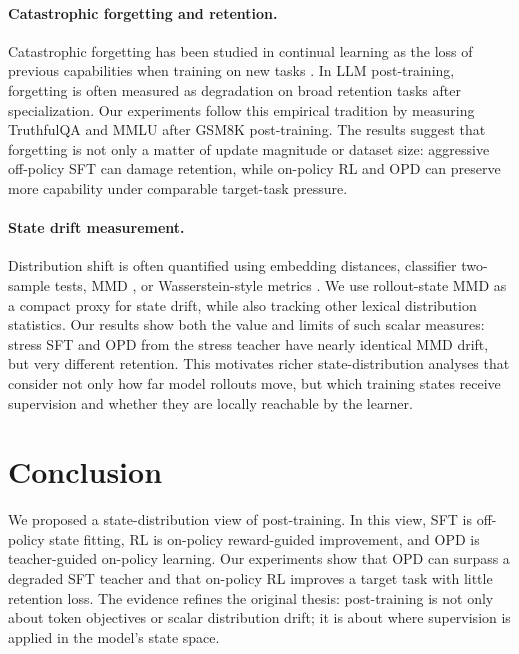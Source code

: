 \documentclass{article}
\begin{document}
\paragraph{Catastrophic forgetting and retention.}
Catastrophic forgetting has been studied in continual learning as the loss of
previous capabilities when training on new tasks
\citep{mccloskey1989catastrophic,french1999catastrophic,kirkpatrick2017overcoming,lopez2017gradient}.
In LLM post-training, forgetting is often measured as degradation on broad
retention tasks after specialization. Our experiments follow this empirical
tradition by measuring TruthfulQA and MMLU after GSM8K post-training. The
results suggest that forgetting is not only a matter of update magnitude or
dataset size: aggressive off-policy SFT can damage retention, while on-policy RL
and OPD can preserve more capability under comparable target-task pressure.

\paragraph{State drift measurement.}
Distribution shift is often quantified using embedding distances, classifier
two-sample tests, MMD \citep{gretton2012kernel}, or Wasserstein-style metrics
\citep{rabin2011wasserstein,arjovsky2017wasserstein}. We use rollout-state MMD
as a compact proxy for state drift, while also tracking other lexical
distribution statistics. Our results show both the value and limits of such
scalar measures: stress SFT and OPD from the stress teacher have nearly
identical MMD drift, but very different retention. This motivates richer
state-distribution analyses that consider not only how far model rollouts move,
but which training states receive supervision and whether they are locally
reachable by the learner.

\section{Conclusion}

We proposed a state-distribution view of post-training. In this view, SFT is
off-policy state fitting, RL is on-policy reward-guided improvement, and OPD is
teacher-guided on-policy learning. Our experiments show that OPD can surpass a
degraded SFT teacher and that on-policy RL improves a target task with little
retention loss. The evidence refines the original thesis: post-training is not
only about token objectives or scalar distribution drift; it is about where
supervision is applied in the model's state space.



\end{document}
